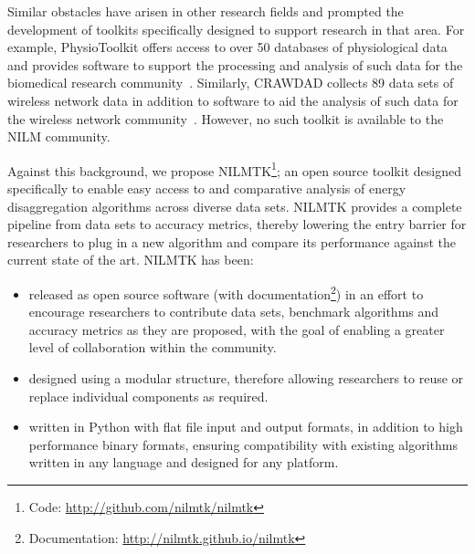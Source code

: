 \documentclass{sig-alternate}
\begin{document}
Similar obstacles have arisen in other research fields and prompted the development of toolkits specifically designed to support research in that area. For example, PhysioToolkit offers access to over 50 databases of physiological data and provides software to support the processing and analysis of such data for the biomedical research community~\cite{physionet}. Similarly, CRAWDAD collects 89 data sets of wireless network data in addition to software to aid the analysis of such data for the wireless network community~\cite{crawdad}. However, no such toolkit is available to the NILM community.

Against this background, we propose NILMTK\footnote{Code: \url{http://github.com/nilmtk/nilmtk}}; an open source toolkit designed specifically to enable easy access to and comparative analysis of energy disaggregation algorithms across diverse data sets. NILMTK provides a complete pipeline from data sets to accuracy metrics, thereby lowering the entry barrier for researchers to plug in a new algorithm and compare its performance against the current state of the art. NILMTK has been:
\begin{itemize}
\item released as open source software (with documentation\footnote{Documentation: \url{http://nilmtk.github.io/nilmtk}}) in an effort to encourage researchers to contribute data sets, benchmark algorithms and accuracy metrics as they are proposed, with the goal of enabling a greater level of collaboration within the community. 
\item designed using a modular structure, therefore allowing researchers to reuse or replace individual components as required. 
\item written in Python with flat file input and output formats, in addition to high performance binary formats, ensuring compatibility with existing algorithms written in any language and designed for any platform.
\end{itemize}
\end{document}
